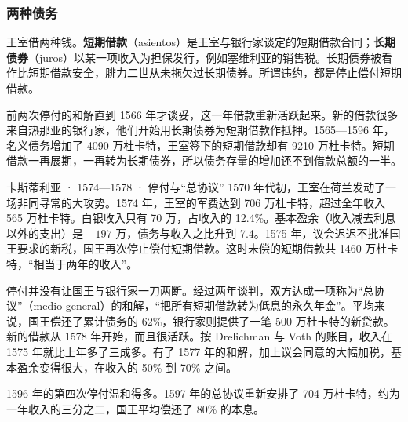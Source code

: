 
\subsubsection{两种债务}
王室借两种钱。\textbf{短期借款}（asientos）是王室与银行家谈定的短期借款合同；\textbf{长期债券}（juros）以某一项收入为担保发行，例如塞维利亚的销售税\cite{dv2010}。长期债券被看作比短期借款安全，腓力二世从未拖欠过长期债券\cite{dv2010}。所谓违约，都是停止偿付短期借款。

前两次停付的和解直到 1566 年才谈妥，这一年借款重新活跃起来。新的借款很多来自热那亚的银行家，他们开始用长期债券为短期借款作抵押\cite{dv2010}。1565—1596 年，名义债务增加了 4090 万杜卡特，王室签下的短期借款却有 9210 万杜卡特\cite{dv2010}。短期借款一再展期，一再转为长期债券，所以债务存量的增加还不到借款总额的一半。

\begin{case}{卡斯蒂利亚 · 1574—1578 · 停付与“总协议”}
1570 年代初，王室在荷兰发动了一场非同寻常的大攻势\cite{dv2010}。1574 年，王室的军费达到 706 万杜卡特，超过全年收入 565 万杜卡特。白银收入只有 70 万，占收入的 12.4\%。基本盈余（收入减去利息以外的支出）是 $-197$ 万，债务与收入之比升到 7.4\cite{dv2010}。1575 年，议会迟迟不批准国王要求的新税，国王再次停止偿付短期借款\cite{dv2010}。这时未偿的短期借款共 1460 万杜卡特，“相当于两年的收入”\cite{dv2010}。

停付并没有让国王与银行家一刀两断。经过两年谈判，双方达成一项称为“总协议”（medio general）的和解，“把所有短期借款转为低息的永久年金”。平均来说，国王偿还了累计债务的 62\%，银行家则提供了一笔 500 万杜卡特的新贷款\cite{dv2010}。新的借款从 1578 年开始，而且很活跃\cite{dv2010}。按 Drelichman 与 Voth 的账目，收入在 1575 年就比上年多了三成多。有了 1577 年的和解，加上议会同意的大幅加税，基本盈余变得很大，在收入的 50\% 到 70\% 之间\cite{dv2010}。

1596 年的第四次停付温和得多。1597 年的总协议重新安排了 704 万杜卡特，约为一年收入的三分之二，国王平均偿还了 80\% 的本息\cite{dv2010}。
\end{case}

